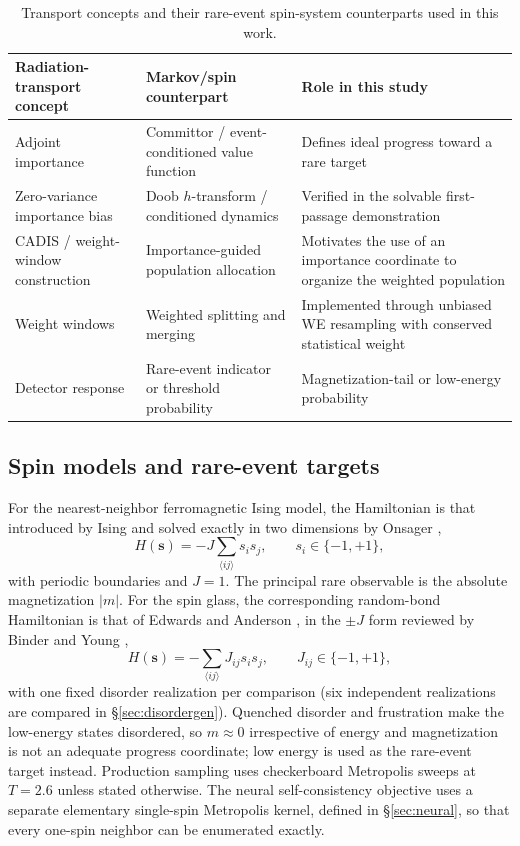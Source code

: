 \documentclass[a4paper,fleqn]{cas-sc}
\begin{document}
\begin{table}[H]
\centering\small
\caption{Transport concepts and their rare-event spin-system counterparts used in this work.}
\label{tab:map}
\begin{tabular}{p{}p{}p{}}
\toprule
Radiation-transport concept & Markov/spin counterpart & Role in this study \\
\midrule
Adjoint importance & Committor / event-conditioned value function & Defines ideal progress
toward a rare target \\
Zero-variance importance bias & Doob $h$-transform / conditioned dynamics & Verified in the
solvable first-passage demonstration \\
CADIS / weight-window construction & Importance-guided population allocation & Motivates the
use of an importance coordinate to organize the weighted population \\
Weight windows & Weighted splitting and merging & Implemented through unbiased WE resampling
with conserved statistical weight \\
Detector response & Rare-event indicator or threshold probability & Magnetization-tail or
low-energy probability \\
\bottomrule
\end{tabular}
\end{table}

\subsection{Spin models and rare-event targets}\label{sec:models}
For the nearest-neighbor ferromagnetic Ising model, the Hamiltonian is that introduced by
Ising \citep{ising1925} and solved exactly in two dimensions by Onsager \citep{onsager1944},
\begin{equation}
H(\mathbf s)=-J\sum_{\langle ij\rangle}s_is_j,\qquad s_i\in\{-1,+1\},
\label{eq:ising}
\end{equation}
with periodic boundaries and $J=1$. The principal rare observable is the absolute
magnetization $|m|$. For the spin glass, the corresponding random-bond Hamiltonian is that of
Edwards and Anderson \citep{edwards1975}, in the $\pm J$ form reviewed by Binder and Young
\citep{binder1986},
\begin{equation}
H(\mathbf s)=-\sum_{\langle ij\rangle}J_{ij}s_is_j,\qquad J_{ij}\in\{-1,+1\},
\label{eq:ea}
\end{equation}
with one fixed disorder realization per comparison (six independent realizations are
compared in \S\ref{sec:disordergen}). Quenched disorder and frustration make the low-energy
states disordered, so $m\approx0$ irrespective of energy and magnetization is not an adequate
progress coordinate; low energy is used as the rare-event target instead. Production sampling
uses checkerboard Metropolis sweeps \citep{metropolis1953} at $T=2.6$ unless stated otherwise.
The neural self-consistency objective uses a separate elementary single-spin Metropolis kernel,
defined in \S\ref{sec:neural}, so that every one-spin neighbor can be enumerated exactly.
\end{document}
